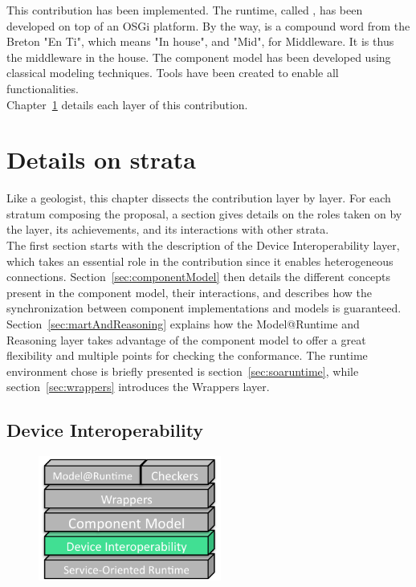 \par This contribution has been implemented. The runtime, called \enti{}, has been developed on top of an OSGi platform. By the way, \enti{} is a compound word from the Breton "En Ti", which means "In house", and "Mid", for Middleware. It is thus the middleware in the house. The component model has been developed using classical modeling techniques. Tools have been created to enable all functionalities.\\
Chapter~\ref{ch:detailsStrata} details each layer of this contribution.


\chapter{Details on strata}
\label{ch:detailsStrata}


Like a geologist, this chapter dissects the contribution layer by layer. For each stratum composing the proposal, a section gives details on the roles taken on by the layer, its achievements, and its interactions with other strata.\\

The first section starts with the description of the Device Interoperability layer, which takes an essential role in the contribution since it enables heterogeneous connections. Section~\ref{sec:componentModel} then details the different concepts present in the component model, their interactions, and describes how the synchronization between component implementations and models is guaranteed. Section~\ref{sec:martAndReasoning} explains how the Model@Runtime and Reasoning layer takes advantage of the component model to offer a great flexibility and multiple points for checking the conformance. The runtime environment chose is briefly presented is section~\ref{sec:soaruntime}, while section~\ref{sec:wrappers} introduces the Wrappers layer.

\section{Device Interoperability}

\begin{figure}
  \vspace{-5mm}
  \includegraphics[width=60mm]{part2/pics/layers/DevicesInterop.pdf}
  \vspace{-5mm}
\end{figure}

